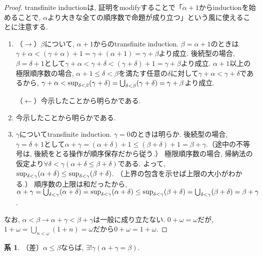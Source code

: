 \documentclass[a4paper, twoside]{bxjsarticle}
\theoremstyle{definition}
\newtheorem{cor}[thm]{系}
\begin{document}
        \begin{proof}
            transfinite inductionは, 証明をmodifyすることで「$\alpha+1$からinductionを始めることで, $\alpha$より大きな全ての順序数で命題が成り立つ」という風に使えることに注意する.
            \begin{enumerate}
                \item （$\rightarrow$）$\beta$について, $\alpha+1$からのtransfinite induction. $\beta = \alpha+1$のときは$\gamma+\alpha<(\gamma+\alpha)+1=\gamma+(\alpha+1)=\gamma+\beta$より成立. 後続型の場合, $\beta = \delta+1$として$\gamma+\alpha<\gamma+\delta<(\gamma+\delta)+1=\gamma+\beta$より成立. $\alpha+1$以上の極限順序数の場合, $\alpha+1\leq\delta<\beta$を満たす任意の$\delta$に対して$\gamma+\alpha<\gamma+\delta$であるから, $\gamma+\alpha<{\rm sup}_{\delta<\beta}(\gamma+\delta)=\bigcup_{\delta<\beta}(\gamma+\delta)=\gamma+\beta$より成立.
                
                （$\leftarrow$）今示したことから明らかである.
                \item 今示したことから明らかである.
                \item $\gamma$についてtransfinite induction. $\gamma=0$のときは明らか. 後続型の場合, $\gamma=\delta+1$として$\alpha+\gamma=(\alpha+\delta)+1\leq(\beta+\delta)+1=\beta+\gamma$.（途中の不等号は, 後続をとる操作が順序保存だから従う.） 極限順序数の場合, 帰納法の仮定より$\forall \delta<\gamma(\alpha+\delta\leq\beta+\delta)$である. よって, ${\rm sup}_{\delta<\gamma}(\alpha+\delta)\leq{\rm sup}_{\delta<\gamma}(\beta+\delta)$. （上界の包含を示せば上限の大小がわかる.） 順序数の上限は和だったから, $\alpha+\gamma = \bigcup_{\delta<\gamma}(\alpha+\delta)={\rm sup}_{\delta<\gamma}(\alpha+\delta)\leq{\rm sup}_{\delta<\gamma}(\beta+\delta)=\bigcup_{\delta<\gamma}(\beta+\delta)=\beta+\gamma$.
            \end{enumerate}
            なお, $\alpha<\beta \to \alpha+\gamma<\beta+\gamma$は一般に成り立たない. $0+\omega=\omega$だが, $1+\omega=\bigcup_{n<\omega}(1+n)=\omega$だから$0+\omega=1+\omega$.
        \end{proof}
        \begin{cor}
            （差）$\alpha\leq\beta$ならば, $\exists ! \gamma(\alpha+\gamma = \beta)$.
        \end{cor}
\end{document}
